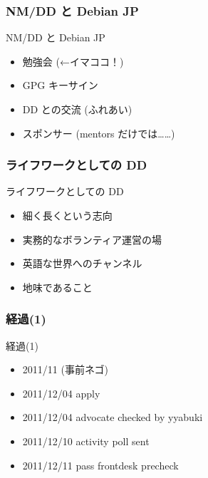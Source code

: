\documentclass[cjk,dvipdfmx,10pt,%
hyperref={bookmarks=true,bookmarksnumbered=true,bookmarksopen=false,%
colorlinks=false,%
pdftitle={第 54 回 関西 Debian 勉強会},%
pdfauthor={倉敷・のがた・佐々木},%
pdfsubject={資料},%
}]{beamer}
\begin{document}
\begin{frame}[fragile]
\frametitle{NM/DD と Debian JP}

\begin{block}{NM/DD と Debian JP}
  \begin{itemize}
  \item 勉強会 (←イマココ！)
  \item GPG キーサイン
  \item DD との交流 (ふれあい)
  \item スポンサー (mentors だけでは……)
  \end{itemize}
\end{block}
\end{frame}


\begin{frame}[fragile]
\frametitle{ライフワークとしての DD}

\begin{block}{ライフワークとしての DD}
  \begin{itemize}
  \item 細く長くという志向
  \item 実務的なボランティア運営の場
  \item 英語な世界へのチャンネル
  \item 地味であること
  \end{itemize}
\end{block}
\end{frame}



\begin{frame}[fragile]
\frametitle{経過(1)}

\begin{block}{経過(1)}
  \begin{itemize}
  \item 2011/11 (事前ネゴ)
  \item 2011/12/04 apply
  \item 2011/12/04 advocate checked by yyabuki
  \item 2011/12/10 activity poll sent
  \item 2011/12/11 pass frontdesk precheck
  \end{itemize}
\end{block}
\end{frame}
\end{document}
